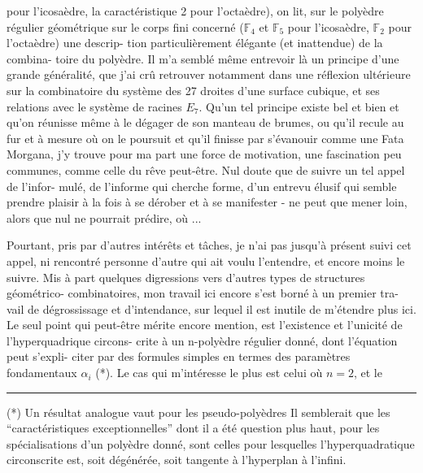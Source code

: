 
pour l'icosaèdre, la caractéristique 2 pour l'octaèdre), on lit,
sur le polyèdre régulier géométrique sur le corps fini concerné
($\mathbb{F}_4$ et $\mathbb{F}_5$ pour l'icosaèdre, $\mathbb{F}_2$ pour l'octaèdre) une descrip-%
tion particulièrement élégante (et inattendue) de la combina-%
toire du polyèdre. Il m'a semblé même entrevoir là un principe
d'une grande généralité, que j'ai crû retrouver notamment dans
une réflexion ultérieure sur la combinatoire du système des 27
droites d'une surface cubique, et ses relations avec le système
de racines $E_7$. Qu'un tel principe existe bel et bien et qu'on
réunisse même à le dégager de son manteau de brumes, ou qu'il
recule au fur et à mesure où on le poursuit et qu'il finisse par
s'évanouir comme une Fata Morgana, j'y trouve pour ma part une
force de motivation, une fascination peu communes, comme celle du
rêve peut-être. Nul doute que de suivre un tel appel de l'infor-%
mulé, de l'informe qui cherche forme, d'un entrevu
élusif qui semble prendre plaisir à la fois à se dérober et à se
manifester - ne peut que mener loin, alors que nul ne pourrait
prédire, où ...

Pourtant, pris par d'autres intérêts et tâches, je n'ai
pas jusqu'à présent suivi cet appel, ni rencontré personne d'autre
qui ait voulu l'entendre, et encore moins le suivre. Mis à part
quelques digressions vers d'autres types de structures géométrico-
combinatoires, mon travail ici encore s'est borné à un premier tra-%
vail de dégrossissage et d'intendance, sur lequel il est inutile
de m'étendre plus ici. Le seul point qui peut-être mérite encore
mention, est l'existence et l'unicité de l'hyperquadrique circons-%
crite à un n-polyèdre régulier donné, dont l'équation peut s'expli-%
citer par des formules simples en termes des paramètres fondamentaux
$\alpha_i$ (*). Le cas qui m'intéresse le plus est celui où $n = 2$, et le

\rule{5cm}{0.4pt}

(*) Un résultat analogue vaut pour les pseudo-polyèdres Il semblerait
que les ``caractéristiques exceptionnelles'' dont il a été question plus
haut, pour les spécialisations d'un polyèdre donné, sont celles pour
lesquelles l'hyperquadratique circonscrite est, soit dégénérée, soit
tangente à l'hyperplan à l'infini.

